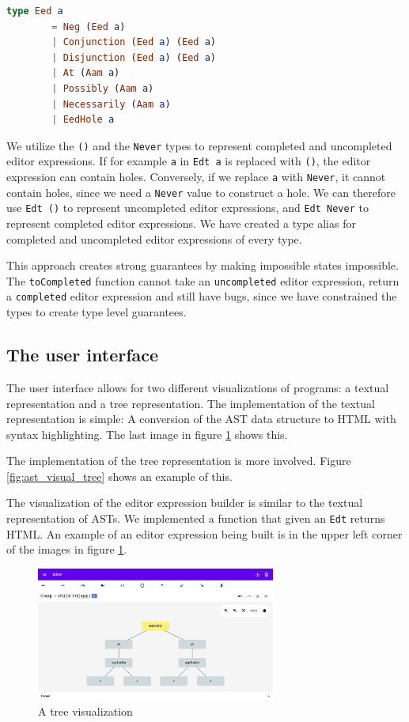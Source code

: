\begin{lstlisting}[language=elm,%
                   label="eed-definitions",%
                   gobble=4,%
                   ]
    type Eed a
        = Neg (Eed a)
        | Conjunction (Eed a) (Eed a)
        | Disjunction (Eed a) (Eed a)
        | At (Aam a)
        | Possibly (Aam a)
        | Necessarily (Aam a)
        | EedHole a
\end{lstlisting}

We utilize the \texttt{()} and the \texttt{Never} types to represent
completed and uncompleted editor expressions. If for example \texttt{a} in
\texttt{Edt a} is replaced with \texttt{()}, the editor expression can contain
holes. Conversely, if we replace \texttt{a} with \texttt{Never}, it cannot
contain holes, since we need a \texttt{Never} value to construct a hole. We can
therefore use \texttt{Edt ()} to represent uncompleted editor expressions, and
\texttt{Edt Never} to represent completed editor expressions. We have created a
type alias for completed and uncompleted editor expressions of every type.

This approach creates strong guarantees by making impossible states impossible.
The \texttt{toCompleted} function cannot take an \texttt{uncompleted} editor
expression, return a \texttt{completed} editor expression and still have bugs,
since we have constrained the types to create type level guarantees.

\subsection{The user interface}
\label{user-interface}

The user interface allows for two different visualizations of
programs: a textual representation and a tree representation. The
implementation of the textual representation is simple: A conversion
of the AST data structure to HTML with syntax highlighting. The last
image in figure \ref{fig:final_ui} shows this.

The implementation of the tree representation is more involved. Figure
\ref{fig:ast_visual_tree} shows an example of this.

The visualization of the editor expression builder is similar to the textual
representation of ASTs. We implemented a function that given an \texttt{Edt}
returns HTML. An example of an
editor expression being built is in the upper left corner of the images in
figure \ref{fig:final_ui}.

\begin{figure}
  \begin{center}
    \includegraphics[width=0.7\textwidth]{assets/final_ui1.png}
  \end{center}
  \caption{A tree visualization}
  \label{fig:final_ui}
\end{figure}



